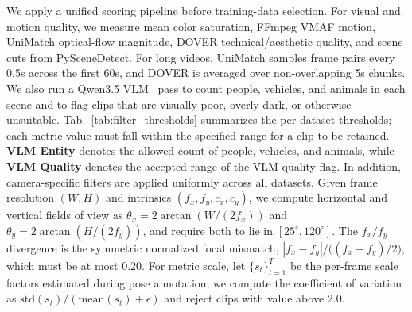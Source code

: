 We apply a unified scoring pipeline before training-data selection.
For visual and motion quality, we measure mean color saturation, FFmpeg VMAF motion, UniMatch optical-flow magnitude, DOVER technical/aesthetic quality, and scene cuts from PySceneDetect.
For long videos, UniMatch samples frame pairs every 0.5s across the first 60s, and DOVER is averaged over non-overlapping 5s chunks.
We also run a Qwen3.5 VLM~\citep{qwen3_5} pass to count people, vehicles, and animals in each scene and to flag clips that are visually poor, overly dark, or otherwise unsuitable.
Tab.~\ref{tab:filter_thresholds} summarizes the per-dataset thresholds; each metric value must fall within the specified range for a clip to be retained.
\textbf{VLM Entity} denotes the allowed count of people, vehicles, and animals, while \textbf{VLM Quality} denotes the accepted range of the VLM quality flag.
In addition, camera-specific filters are applied uniformly across all datasets.
Given frame resolution $(W,H)$ and intrinsics $(f_x,f_y,c_x,c_y)$, we compute horizontal and vertical fields of view as $\theta_x=2\arctan(W/(2f_x))$ and $\theta_y=2\arctan(H/(2f_y))$, and require both to lie in $[25^\circ,120^\circ]$.
The $f_x/f_y$ divergence is the symmetric normalized focal mismatch,
$|f_x-f_y| / \bigl((f_x+f_y)/2\bigr)$, which must be at most $0.20$.
For metric scale, let $\{s_t\}_{t=1}^T$ be the per-frame scale factors estimated during pose annotation; we compute the coefficient of variation as $\mathrm{std}(s_t)/(\mathrm{mean}(s_t)+\epsilon)$ and reject clips with value above $2.0$.

